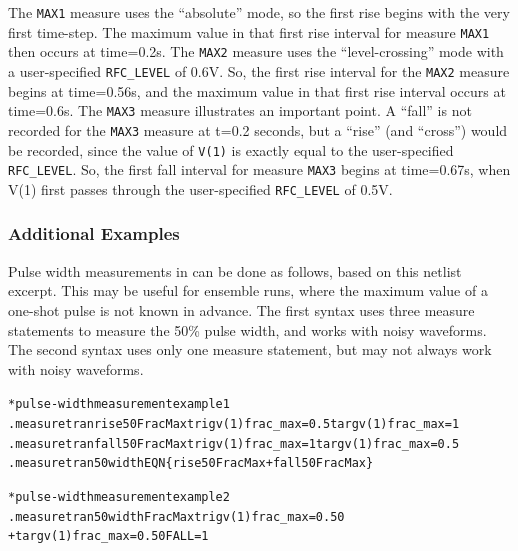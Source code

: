 The \texttt{MAX1} measure uses the ``absolute'' mode, so the first
rise begins with the very first time-step.  The maximum value in that
first rise interval for measure \texttt{MAX1} then occurs at
time=0.2s.  The \texttt{MAX2} measure uses the ``level-crossing'' mode
with a user-specified \texttt{RFC\_LEVEL} of 0.6V.  So, the first rise
interval for the \texttt{MAX2} measure begins at time=0.56s, and the
maximum value in that first rise interval occurs at time=0.6s.  The
\texttt{MAX3} measure illustrates an important point.  A ``fall'' is not
recorded for the \texttt{MAX3} measure at t=0.2 seconds, but a
``rise'' (and ``cross'') would be recorded, since the value
of \texttt{V(1)} is exactly equal to the
user-specified \texttt{RFC\_LEVEL}. So, the first fall interval for
measure
\texttt{MAX3} begins at time=0.67s, when V(1) first passes through the
user-specified \texttt{RFC\_LEVEL} of 0.5V.

\subsubsection{Additional Examples}
\label{Measure_Additional_Examples}
Pulse width measurements in \Xyce{} can be done as follows, based on
this netlist excerpt.  This may be useful for ensemble runs, where the
maximum value of a one-shot pulse is not known in advance.  The first
syntax uses three measure statements to measure the 50\% pulse width,
and works with noisy waveforms.  The second syntax uses only one
measure statement, but may not always work with noisy waveforms.

\begin{alltt}
* pulse-width measurement example 1
.measure tran rise50FracMax trig v(1) frac_max=0.5 targ v(1) frac_max=1
.measure tran fall50FracMax trig v(1) frac_max=1 targ v(1) frac_max=0.5
.measure tran 50width EQN\{rise50FracMax + fall50FracMax\}

* pulse-width measurement example 2
.measure tran 50widthFracMax trig v(1) frac_max=0.50
+ targ v(1) frac_max=0.50 FALL=1
\end{alltt}

